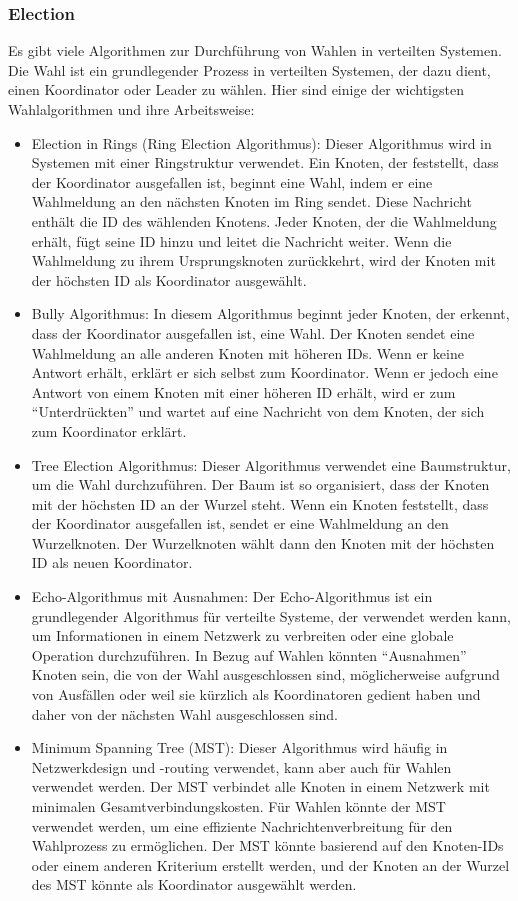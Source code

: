 \subsubsection{Election}
Es gibt viele Algorithmen zur Durchführung von Wahlen in verteilten Systemen. Die Wahl ist ein grundlegender Prozess in verteilten Systemen, der dazu dient, einen Koordinator oder Leader zu wählen. Hier sind einige der wichtigsten Wahlalgorithmen und ihre Arbeitsweise:
\begin{itemize}
\item Election in Rings (Ring Election Algorithmus): Dieser Algorithmus wird in Systemen mit einer Ringstruktur verwendet. Ein Knoten, der feststellt, dass der Koordinator ausgefallen ist, beginnt eine Wahl, indem er eine Wahlmeldung an den nächsten Knoten im Ring sendet. Diese Nachricht enthält die ID des wählenden Knotens. Jeder Knoten, der die Wahlmeldung erhält, fügt seine ID hinzu und leitet die Nachricht weiter. Wenn die Wahlmeldung zu ihrem Ursprungsknoten zurückkehrt, wird der Knoten mit der höchsten ID als Koordinator ausgewählt.
\item Bully Algorithmus: In diesem Algorithmus beginnt jeder Knoten, der erkennt, dass der Koordinator ausgefallen ist, eine Wahl. Der Knoten sendet eine Wahlmeldung an alle anderen Knoten mit höheren IDs. Wenn er keine Antwort erhält, erklärt er sich selbst zum Koordinator. Wenn er jedoch eine Antwort von einem Knoten mit einer höheren ID erhält, wird er zum \enquote{Unterdrückten} und wartet auf eine Nachricht von dem Knoten, der sich zum Koordinator erklärt.
\item Tree Election Algorithmus: Dieser Algorithmus verwendet eine Baumstruktur, um die Wahl durchzuführen. Der Baum ist so organisiert, dass der Knoten mit der höchsten ID an der Wurzel steht. Wenn ein Knoten feststellt, dass der Koordinator ausgefallen ist, sendet er eine Wahlmeldung an den Wurzelknoten. Der Wurzelknoten wählt dann den Knoten mit der höchsten ID als neuen Koordinator.
\item Echo-Algorithmus mit Ausnahmen: Der Echo-Algorithmus ist ein grundlegender Algorithmus für verteilte Systeme, der verwendet werden kann, um Informationen in einem Netzwerk zu verbreiten oder eine globale Operation durchzuführen. In Bezug auf Wahlen könnten \enquote{Ausnahmen} Knoten sein, die von der Wahl ausgeschlossen sind, möglicherweise aufgrund von Ausfällen oder weil sie kürzlich als Koordinatoren gedient haben und daher von der nächsten Wahl ausgeschlossen sind.
\item Minimum Spanning Tree (MST): Dieser Algorithmus wird häufig in Netzwerkdesign und -routing verwendet, kann aber auch für Wahlen verwendet werden. Der MST verbindet alle Knoten in einem Netzwerk mit minimalen Gesamtverbindungskosten. Für Wahlen könnte der MST verwendet werden, um eine effiziente Nachrichtenverbreitung für den Wahlprozess zu ermöglichen. Der MST könnte basierend auf den Knoten-IDs oder einem anderen Kriterium erstellt werden, und der Knoten an der Wurzel des MST könnte als Koordinator ausgewählt werden.
\end{itemize}
